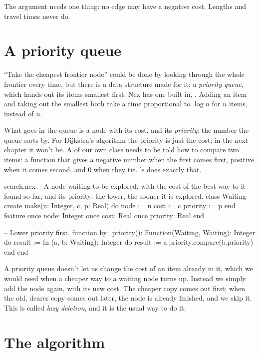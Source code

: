 The argument needs one thing: no edge may have a negative cost. Lengths
and travel times never do.

\section{A priority queue}

``Take the cheapest frontier node'' could be done by looking through the
whole frontier every time, but there is a data structure made for it: a
\emph{priority queue}, which hands out its items smallest first. Nex has
one built in, . Adding an item and taking out the smallest
both take a time proportional to $\log n$ for $n$ items, instead of $n$.

What goes in the queue is a node with its cost, and its \emph{priority}:
the number the queue sorts by. For Dijkstra's algorithm the priority is
just the cost; in the next chapter it won't be. A  of our
own class needs to be told how to compare two items: a function that gives
a negative number when the first comes first, positive when it comes
second, and 0 when they tie. 's  does exactly that.

\begin{append}{search.nex}
-- A node waiting to be explored, with the cost of the best way to it
-- found so far, and its priority: the lower, the sooner it is explored.
class Waiting
create
  make(n: Integer, c, p: Real) do
    node := n
    cost := c
    priority := p
  end
feature
  once node: Integer
  once cost: Real
  once priority: Real
end

-- Lower priority first.
function by_priority(): Function(Waiting, Waiting): Integer do
  result := fn (a, b: Waiting): Integer do result := a.priority.compare(b.priority) end
end
\end{append}

A priority queue doesn't let us change the cost of an item already in it,
which we would need when a cheaper way to a waiting node turns up. Instead
we simply add the node again, with its new cost. The cheaper copy comes out
first; when the old, dearer copy comes out later, the node is already
finished, and we skip it. This is called \emph{lazy deletion}, and it is
the usual way to do it.

\section{The algorithm}

